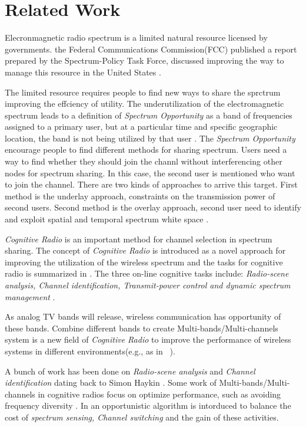 \section{Related Work}
\label{sec:related}

Elecronmagnetic radio spectrum is a limited natural resource licensed by governments.  the Federal Communications Commission(FCC) published a report prepared by the Spectrum-Policy Task Force, discussed improving the way to manage this resource in the United States \cite{federal2002spectrum}. 

The limited resource requires people to find new ways to share the sprctrum improving the effciency of utility. 
The underutilization of the electromagnetic spectrum leads to a definition of \emph{Spectrum Opportunity} as a band of frequencies assigned to a primary user, but at a particular time and specific geographic location, the band is not being utilized by that user \cite{kolodzy2001next}.
The \emph{Spectrum Opportunity} encourage people to find different methods for sharing spectrum.
Users need a way to find whether they should join the channl without interferencing other nodes for spectrum sharing.
In this case, the second user is mentioned who want to join the channel.
There are two kinds of approaches to arrive this target. First method is the underlay approach, constraints on the transmission power of second users. 
Second method is the overlay approach, second user need to identify and exploit spatial and temporal spectrum white space \cite{zhao2007survey}.

\emph{Cognitive Radio} is an important method for channel selection in spectrum sharing.
The concept of \emph{Cognitive Radio} is introduced as a novel approach for improving the utilization of the wireless spectrum and the tasks for cognitive radio is summarized in \cite{haykin2005cognitive}. The three on-line cognitive tasks include: \emph{Radio-scene analysis, Channel identification, Transmit-power control and dynamic spectrum management} \cite{haykin2005cognitive}.

As analog TV bands will release, wireless communication has opportunity of these bands. Combine different bands to create Multi-bands/Multi-channels system is a new field of \emph{Cognitive Radio} to improve the performance of wireless systems in different
environments(e.g., as in ~\cite{MOAR}). 

A bunch of work has been done on \emph{Radio-scene analysis} and \emph{Channel identification} dating back to Simon Haykin \cite{haykin2005cognitive}.
Some work of Multi-bands/Multi-channels in
cognitive radios focus on optimize performance, such as avoiding frequency diversity \cite{rahul2009frequency}. 
In \cite{OAR} an opportunistic algorithm is intorduced to balance the cost of \emph{spectrum sensing, Channel switching} and the gain of these activities.


